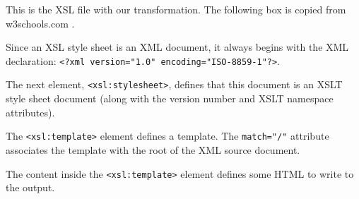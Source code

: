 \documentclass[a4paper,12pt]{article}
\begin{document}
This is the XSL file with our transformation. The following box is copied from w3schools.com \citep{w3xslt}.

\begin{framed}
Since an XSL style sheet is an XML document, it always begins with the XML declaration: \lstinline$<?xml version="1.0" encoding="ISO-8859-1"?>$.

The next element, \lstinline$<xsl:stylesheet>$, defines that this document is an XSLT style sheet document (along with the version number and XSLT namespace attributes).

The \lstinline$<xsl:template>$ element defines a template. The \lstinline$match="/"$ attribute associates the template with the root of the XML source document.

The content inside the \lstinline$<xsl:template>$ element defines some HTML to write to the output.
\end{framed}


\end{document}
